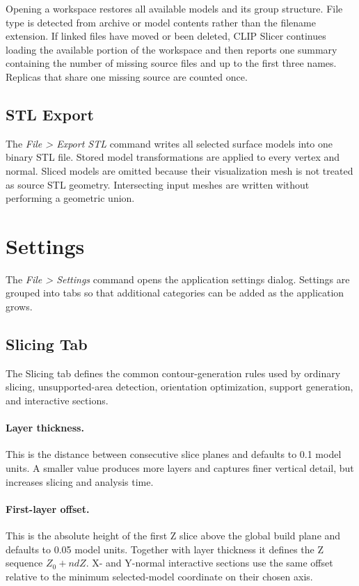 Opening a workspace restores all available models and its group structure.
File type is detected from archive or model contents rather than the filename
extension. If linked files have moved or been deleted, CLIP Slicer continues
loading the available portion of the workspace and then reports one summary
containing the number of missing source files and up to the first three names.
Replicas that share one missing source are counted once.

\subsection{STL Export}

The \emph{File > Export STL} command writes all selected surface models into
one binary STL file. Stored model transformations are applied to every vertex
and normal. Sliced models are omitted because their visualization mesh is not
treated as source STL geometry. Intersecting input meshes are written without
performing a geometric union.

\section{Settings}
\label{settings-dialog}

The \emph{File > Settings} command opens the application settings dialog.
Settings are grouped into tabs so that additional categories can be added as
the application grows.

\subsection{Slicing Tab}
\label{settings-slicing}

The Slicing tab defines the common contour-generation rules used by ordinary
slicing, unsupported-area detection, orientation optimization, support
generation, and interactive sections.

\paragraph{Layer thickness.}
This is the distance between consecutive slice planes and defaults to 0.1 model
units. A smaller value produces more layers and captures finer vertical detail,
but increases slicing and analysis time.

\paragraph{First-layer offset.}
This is the absolute height of the first Z slice above the global build plane
and defaults to 0.05 model units. Together with layer thickness it defines the
Z sequence \(Z_0 + n dZ\). X- and Y-normal interactive sections use the same
offset relative to the minimum selected-model coordinate on their chosen axis.

